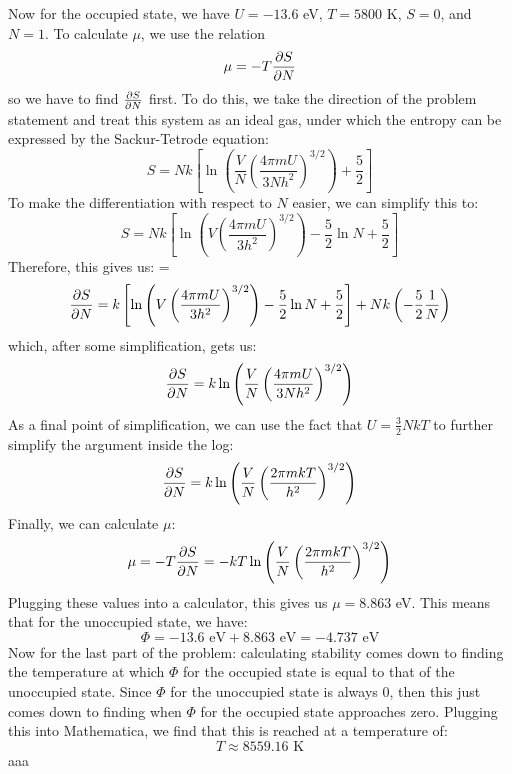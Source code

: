 \documentclass[10pt]{article}
\begin{document}
\begin{enumerate}[label=\alph*)]
\begin{solution}
				Now for the occupied state, we have $U = -13.6$ eV, $T = 5800$ K, $S = 0$, and $N = 1$. To 
				calculate $\mu$, we use the relation
				\[
					\mu= -T \pdv{S}{N}
				\] 
				so we have to find $\pdv{S}{N}$ first. To do this, we take the direction of the problem 
				statement and treat this system as an ideal gas, under which the entropy can be 
				expressed by the Sackur-Tetrode equation:
				\[
					S = Nk\left[ \ln\left( \frac{V}{N}\left( \frac{4\pi m U }{3Nh^2} \right)^{3 / 2} \right) + \frac{5}{2} \right] 
				\] 
				To make the differentiation with respect to $N$ easier, we can simplify this to:
				\[
					S = Nk\left[ \ln\left( V\left( \frac{4 \pi m U}{3h^2} \right)^{3 / 2} \right) 
					- \frac{5}{2} \ln N + \frac{5}{2}\right] 	
				\] 
				Therefore, this gives us: =
				\[
					\pdv{S}{N} = k\left[ \ln\left( V\left( \frac{4 \pi m U}{3h^2} \right)^{3 / 2} \right) 
					- \frac{5}{2} \ln N + \frac{5}{2}\right] + Nk \left( -\frac{5}{2}\frac{1}{N} \right) 
				\] 
				which, after some simplification, gets us:
				\[
					\pdv{S}{N} = k \ln \left( \frac{V}{N}\left( \frac{4 \pi m U}{3Nh^2} \right)^{3 / 2} \right) 
				\] 
				As a final point of simplification, we can use the fact that $U = \frac{3}{2}NkT$ to further 
				simplify the argument inside the log:
				\[
					\pdv{S}{N} = k\ln \left( \frac{V}{N} \left( \frac{2 \pi m k T}{h^2} \right)^{3/2} \right) 
				\] 
				Finally, we can calculate $\mu$:
				\[
					\mu = -T \pdv{S}{N} = -kT\ln\left( \frac{V}{N}\left( \frac{2 \pi m kT}{h^2} \right)^{3 / 2} \right) 
				\] 
				Plugging these values into a calculator, this gives us $\mu = 8.863$ eV. This means that for 
				the unoccupied state, we have:
				\[
					\Phi = -13.6 \text{ eV} + 8.863 \text{ eV} = -4.737 \text{ eV}
				\] 
				Now for the last part of the problem: calculating stability comes down to finding the 
				temperature at which $\Phi$ for the occupied state is equal to that of the unoccupied state. 
				Since $\Phi$ for the unoccupied state is always 0, then this just comes down to finding 
				when $\Phi$ for the occupied state approaches zero. Plugging this into Mathematica, we find 
				that this is reached at a temperature of: 
				\[
					T \approx 8559.16 \text{ K}
				\] 
				aaa
			\end{solution}
	\end{enumerate}
\end{document}
